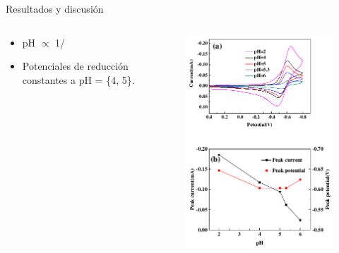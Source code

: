 \documentclass[handout]{beamer}
\begin{document}
\begin{frame}{Resultados y discusi\'on}
	\begin{columns}
		\begin{column}{0.5\textwidth}
			\begin{itemize}
				\item pH $\propto$ 1/\ce{[PyH+]}
				\item Potenciales de reducci\'on constantes a pH = \{4, 5\}.
			\end{itemize}
		\end{column}
		\begin{column}{0.5\textwidth}
			\begin{figure}[h]
				\centering
				\includegraphics[width=\linewidth]{sources/pH}
			\end{figure}
		\end{column}
	\end{columns}
\end{frame}
\end{document}
